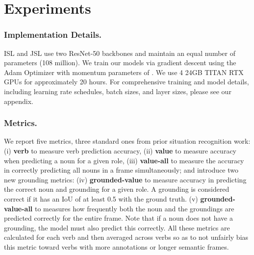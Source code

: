 \documentclass[runningheads]{llncs}
\begin{document}


\vspace{-3mm}
\section{Experiments}
\vspace{-2mm}

\subsubsection{Implementation Details. }

ISL and JSL use two ResNet-50 backbones and maintain an equal number of parameters (108 million). We train our models via gradient descent using the Adam Optimizer \cite{KingmaAndBa2015} with momentum parameters of . We use 4 24GB TITAN RTX GPUs for approximately 20 hours. For comprehensive training and model details, including learning rate schedules, batch sizes, and layer sizes, please see our appendix.








\vspace{-5mm}
\subsubsection{Metrics. }
We report five metrics, three standard ones from prior situation recognition work: (i) \textbf{verb} to measure verb prediction accuracy, (ii) \textbf{value} to measure accuracy when predicting a noun for a given role, (iii) \textbf{value-all} to measure the accuracy in correctly predicting all nouns in a frame simultaneously; and introduce two new grounding metrics: (iv) \textbf{grounded-value} to measure  accuracy in predicting the correct noun and grounding for a given role. A grounding is considered correct if it has an IoU of at least 0.5 with the ground truth. (v) \textbf{grounded-value-all} to measures how frequently both the noun and the groundings are predicted correctly for the entire frame. Note that if a noun does not have a grounding, the model must also predict this correctly. All these metrics are calculated for each verb and then averaged across verbs so as to not unfairly bias this metric toward verbs with more annotations or longer semantic frames. 
\end{document}
